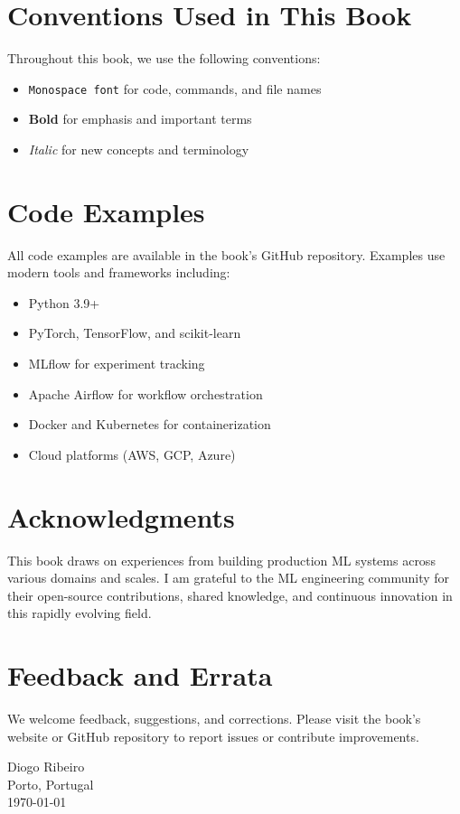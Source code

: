 \section*{Conventions Used in This Book}

Throughout this book, we use the following conventions:

\begin{itemize}
    \item \texttt{Monospace font} for code, commands, and file names
    \item \textbf{Bold} for emphasis and important terms
    \item \textit{Italic} for new concepts and terminology
\end{itemize}

\section*{Code Examples}

All code examples are available in the book's GitHub repository. Examples use modern tools and frameworks including:

\begin{itemize}
    \item Python 3.9+
    \item PyTorch, TensorFlow, and scikit-learn
    \item MLflow for experiment tracking
    \item Apache Airflow for workflow orchestration
    \item Docker and Kubernetes for containerization
    \item Cloud platforms (AWS, GCP, Azure)
\end{itemize}

\section*{Acknowledgments}

This book draws on experiences from building production ML systems across various domains and scales. I am grateful to the ML engineering community for their open-source contributions, shared knowledge, and continuous innovation in this rapidly evolving field.

\section*{Feedback and Errata}

We welcome feedback, suggestions, and corrections. Please visit the book's website or GitHub repository to report issues or contribute improvements.

\vspace{1cm}
\noindent
Diogo Ribeiro \\
Porto, Portugal \\
\today
